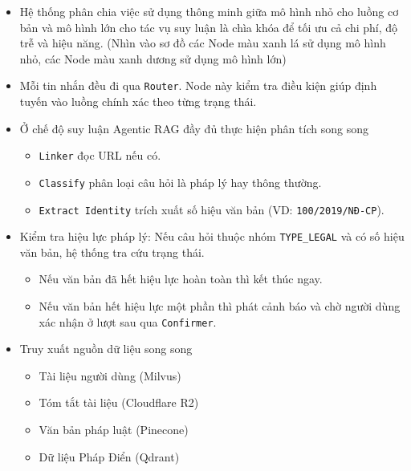 \begin{itemize}
\item Hệ thống
phân chia việc sử dụng thông minh
giữa mô hình nhỏ cho luồng cơ bản
và mô hình lớn cho tác vụ suy luận
là chìa khóa để tối ưu cả chi phí, độ trễ và hiệu năng.
(Nhìn vào sơ đồ các Node màu xanh lá sử dụng mô hình nhỏ,
các Node màu xanh dương sử dụng mô hình lớn)

\item Mỗi tin nhắn đều đi qua \texttt{Router}.
Node này kiểm tra điều kiện
giúp định tuyến vào luồng chính xác
theo từng trạng thái.

\item Ở chế độ suy luận Agentic RAG đầy đủ
thực hiện
phân tích song song

\begin{itemize}

\item \texttt{Linker} đọc URL nếu có.
\item \texttt{Classify} phân loại câu hỏi là pháp lý hay thông thường.
\item \texttt{Extract Identity} trích xuất số hiệu văn bản (VD: \texttt{100/2019/NĐ-CP}).

\end{itemize}

\item Kiểm tra hiệu lực pháp lý:
Nếu câu hỏi thuộc nhóm \texttt{TYPE\_LEGAL} và có số hiệu văn bản,
hệ thống tra cứu trạng thái.

\begin{itemize}

\item Nếu văn bản đã hết hiệu lực hoàn toàn
thì kết thúc ngay.
\item Nếu văn bản hết hiệu lực một phần
thì phát cảnh báo và chờ người dùng xác nhận ở lượt sau qua \texttt{Confirmer}.

\end{itemize}

\item Truy xuất nguồn dữ liệu song song

\begin{itemize}

\item Tài liệu người dùng (Milvus)
\item Tóm tắt tài liệu (Cloudflare R2)
\item Văn bản pháp luật (Pinecone)
\item Dữ liệu Pháp Điển (Qdrant)


\end{itemize}
\end{itemize}
